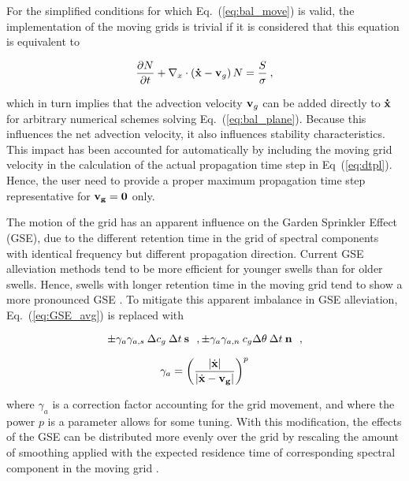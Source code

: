 For the simplified conditions for which Eq.~(\ref{eq:bal_move}) is valid, the
implementation of the moving grids is trivial if it is considered that this
equation is equivalent to

\begin{equation}
\frac{\partial N}{\partial t} + 
\nabla_x \cdot \left ( {\bf\dot{x}}-{\bf{v}}_g \right ) N  = 
\frac{S}{\sigma} \: , \label{eq:bal_move2}
\end{equation}

\noindent
which in turn implies that the advection velocity ${\bf{v}}_g$ can be added
directly to ${\bf\dot{x}}$ for arbitrary numerical schemes solving
Eq.~(\ref{eq:bal_plane}). Because this influences the net advection velocity,
it also influences stability characteristics. This impact has been accounted
for automatically by including the moving grid velocity in the calculation of
the actual propagation time step in Eq~(\ref{eq:dtpl}). Hence, the user need
to provide a proper maximum propagation time step representative for $\bf{v}_g
= 0$ only.

The motion of the grid has an apparent influence on the Garden Sprinkler
Effect (GSE), due to the different retention time in the grid of spectral
components with identical frequency but different propagation direction.
Current GSE alleviation methods tend to be more efficient for younger swells
than for older swells. Hence, swells with longer retention time in the moving
grid tend to show a more pronounced GSE \citep[see][]{tol:OMOD05b}. To
mitigate this apparent imbalance in GSE alleviation,  Eq.~(\ref{eq:GSE_avg}) is
replaced with

\begin{equation}
\pm \gamma_a \gamma_{a,s} \: \Delta c_g \: \Delta t \: \bs \:\:\: ,
\pm \gamma_a \gamma_{a,n} \: c_g \Delta \theta \: \Delta t \: \bn \:\:\: ,
\label{eq:move_GSE_avg1}
\end{equation}

\begin{equation}
\gamma_a = \left ( \frac{|\dot{\bf{x}}|}{|\dot{\bf{x}}-\bf{v}_g|}
\right ) ^{p}
\label{eq:move_GSE_avg2}
\end{equation}

\noindent
where $\gamma_a$ is a correction factor accounting for the grid movement, and
where the power $p$ is a parameter allows for some tuning. With this
modification, the effects of the GSE can be distributed more evenly over the
grid by rescaling the amount of smoothing applied with the expected residence
time of corresponding spectral component in the moving grid
\citep[see][]{tol:OMOD05b}.


